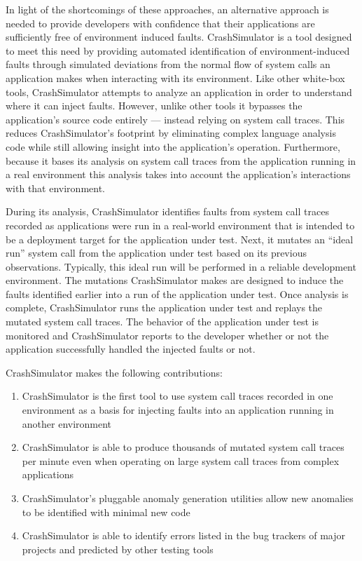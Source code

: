     In light of the shortcomings of these approaches, an alternative approach is needed to provide developers with
    confidence that their applications are sufficiently free of environment induced faults.  CrashSimulator is a tool
    designed to meet this need by providing automated identification of environment-induced faults through simulated
    deviations from the normal flow of system calls an application makes when interacting with its environment. Like
    other white-box tools, CrashSimulator attempts to analyze an application in order to understand where it can inject
    faults.  However, unlike other tools it bypasses the application's source code entirely --- instead relying on
    system call traces.  This reduces CrashSimulator's footprint by eliminating complex language analysis code while
    still allowing insight into the application's operation. Furthermore, because it bases its analysis on system call
    traces from the application running in a real environment this analysis takes into account the application's
    interactions with that environment.

    During its analysis, CrashSimulator identifies faults from system call traces recorded as applications were run in a
    real-world environment that is intended to be a deployment target for the application under test. Next, it mutates
    an ``ideal run'' system call from the application under test based on its previous observations. Typically, this
    ideal run will be performed in a reliable development environment. The mutations CrashSimulator makes are designed
    to induce the faults identified earlier into a run of the application under test. Once analysis is complete,
    CrashSimulator runs the application under test and replays the mutated system call traces. The behavior of the
    application under test is monitored and CrashSimulator reports to the developer whether or not the application
    successfully handled the injected faults or not.

    CrashSimulator makes the following contributions:

    \begin{enumerate}
        \item{CrashSimulator is the first tool to use system call traces recorded in one environment as a basis for
            injecting faults into an application running in another environment}
        \item{CrashSimulator is able to produce thousands of mutated system call traces per minute even when operating
            on large system call traces from complex applications}
        \item{CrashSimulator's pluggable anomaly generation utilities allow new anomalies to be identified with minimal
            new code}
        \item{CrashSimulator is able to identify errors listed in the bug trackers of major projects and predicted by
            other testing tools}
    \end{enumerate}
